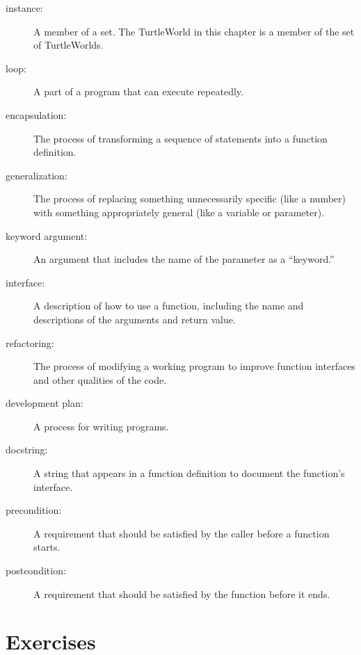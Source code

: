 \documentclass[10pt]{book}
\begin{document}
\begin{description}

\item[instance:] A member of a set.  The TurtleWorld in this
chapter is a member of the set of TurtleWorlds.

\item[loop:] A part of a program that can execute repeatedly.

\item[encapsulation:] The process of transforming a sequence of
statements into a function definition.

\item[generalization:] The process of replacing something
unnecessarily specific (like a number) with something appropriately
general (like a variable or parameter).

\item[keyword argument:] An argument that includes the name of
the parameter as a ``keyword.''

\item[interface:] A description of how to use a function, including
the name and descriptions of the arguments and return value.

\item[refactoring:] The process of modifying a working program to
  improve function interfaces and other qualities of the code.

\item[development plan:] A process for writing programs.

\item[docstring:]  A string that appears in a function definition
to document the function's interface.

\item[precondition:] A requirement that should be satisfied by
the caller before a function starts.

\item[postcondition:] A requirement that should be satisfied by
the function before it ends.

\end{description}


\section{Exercises}
\end{document}
